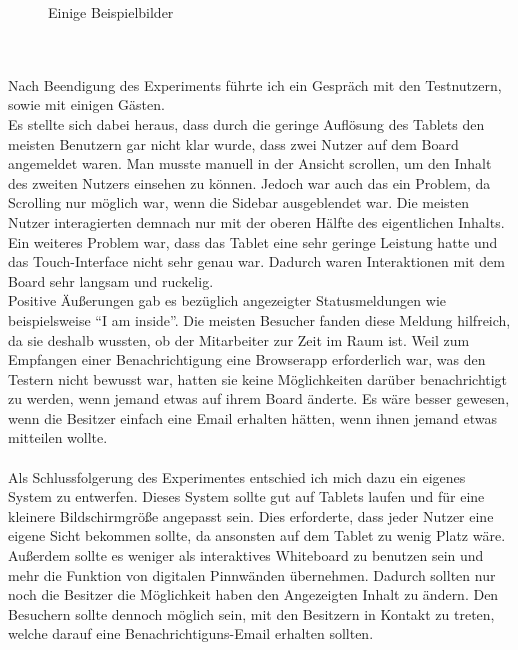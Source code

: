 \begin{figure}[h!]
{      \label{img:experiment04}
    }
  \caption{Einige Beispielbilder}
\end{figure}
\\
\\
Nach Beendigung des Experiments führte ich ein Gespräch mit den Testnutzern, sowie mit einigen Gästen.\\
Es stellte sich dabei heraus, dass durch die geringe Auflösung des Tablets den meisten Benutzern gar nicht klar wurde, dass zwei Nutzer auf dem Board angemeldet waren. Man musste manuell in der Ansicht scrollen, um den Inhalt des zweiten Nutzers einsehen zu können. Jedoch war auch das ein Problem, da Scrolling nur möglich war, wenn die Sidebar ausgeblendet war. Die meisten Nutzer interagierten demnach nur mit der oberen Hälfte des eigentlichen Inhalts.\\
Ein weiteres Problem war, dass das Tablet eine sehr geringe Leistung hatte und das Touch-Interface nicht sehr genau war. Dadurch waren Interaktionen mit dem Board sehr langsam und ruckelig.\\
Positive Äußerungen gab es bezüglich angezeigter Statusmeldungen wie beispielsweise ``I am inside''. Die meisten Besucher fanden diese Meldung hilfreich, da sie deshalb wussten, ob der Mitarbeiter zur Zeit im Raum ist.
Weil zum Empfangen einer Benachrichtigung eine Browserapp erforderlich war, was den Testern nicht bewusst war, hatten sie keine Möglichkeiten darüber benachrichtigt zu werden, wenn jemand etwas auf ihrem Board änderte. Es wäre besser gewesen, wenn die Besitzer einfach eine Email erhalten hätten, wenn ihnen jemand etwas mitteilen wollte.
\\
\\
Als Schlussfolgerung des Experimentes entschied ich mich dazu ein eigenes System zu entwerfen.
Dieses System sollte gut auf Tablets laufen und für eine kleinere Bildschirmgröße angepasst sein. Dies erforderte, dass jeder Nutzer eine eigene Sicht bekommen sollte, da ansonsten auf dem Tablet zu wenig Platz wäre. Außerdem sollte es weniger als interaktives Whiteboard zu benutzen sein und mehr die Funktion von digitalen Pinnwänden übernehmen. Dadurch sollten nur noch die Besitzer die Möglichkeit haben den Angezeigten Inhalt zu ändern. Den Besuchern sollte dennoch möglich sein, mit den Besitzern in Kontakt zu treten, welche darauf eine Benachrichtiguns-Email erhalten sollten.